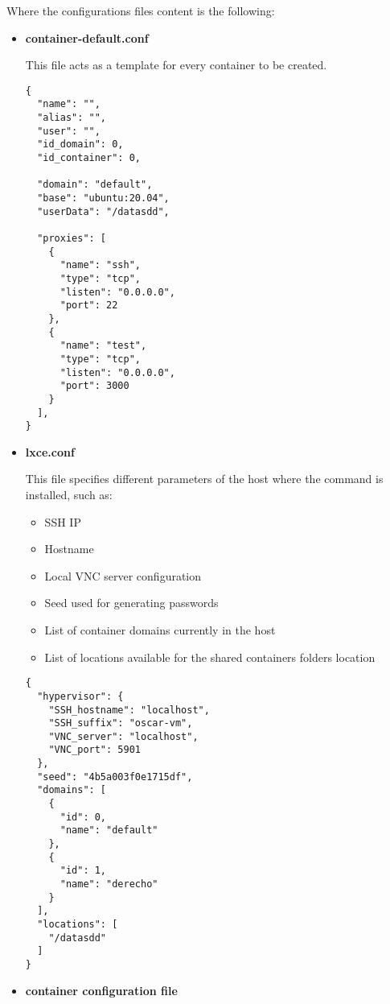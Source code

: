 Where the configurations files content is the following:
\begin{itemize}
\newpage
\item{\textbf{container-default.conf}

This file acts as a template for every container to be created.
\begin{verbatim}
{
  "name": "",                           
  "alias": "",                          
  "user": "",
  "id_domain": 0,
  "id_container": 0,

  "domain": "default",                 
  "base": "ubuntu:20.04",             
  "userData": "/datasdd",            

  "proxies": [                      
    {
      "name": "ssh",
      "type": "tcp",
      "listen": "0.0.0.0",
      "port": 22
    },
    {
      "name": "test",
      "type": "tcp",
      "listen": "0.0.0.0",
      "port": 3000
    }
  ],
}
\end{verbatim}
}
\newpage
\item{\textbf{lxce.conf}

This file specifies different parameters of the host where the command is installed, such as:
\begin{itemize}
	\item{SSH IP}
	\item{Hostname}
	\item{Local VNC server configuration}
	\item{Seed used for generating passwords}
	\item{List of container domains currently in the host}
	\item{List of locations available for the shared containers folders location}
\end{itemize}
\begin{verbatim}
{
  "hypervisor": {
    "SSH_hostname": "localhost",
    "SSH_suffix": "oscar-vm",
    "VNC_server": "localhost",
    "VNC_port": 5901
  },
  "seed": "4b5a003f0e1715df",
  "domains": [
    {
      "id": 0,
      "name": "default"
    },
    {
      "id": 1,
      "name": "derecho"
    }
  ],
  "locations": [
    "/datasdd"
  ]
}
\end{verbatim}
}
\newpage
\item{\textbf{container configuration file}

}
\end{itemize}
